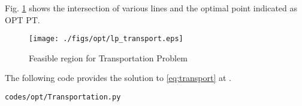 \begin{enumerate}[label=\thesection.\arabic*.,ref=\thesection.\theenumi]
Fig.  \ref{fig:transport}
shows the intersection of various lines and the optimal point indicated as OPT PT.
\begin{figure}[h]
\texttt{[image: ./figs/opt/lp\_transport.eps]}
\caption{Feasible region for Transportation Problem}
\label{fig:transport}
\end{figure}

The following code provides the solution to \eqref{eq:transport} at .
%
\begin{lstlisting}
codes/opt/Transportation.py
\end{lstlisting}

\end{enumerate}
